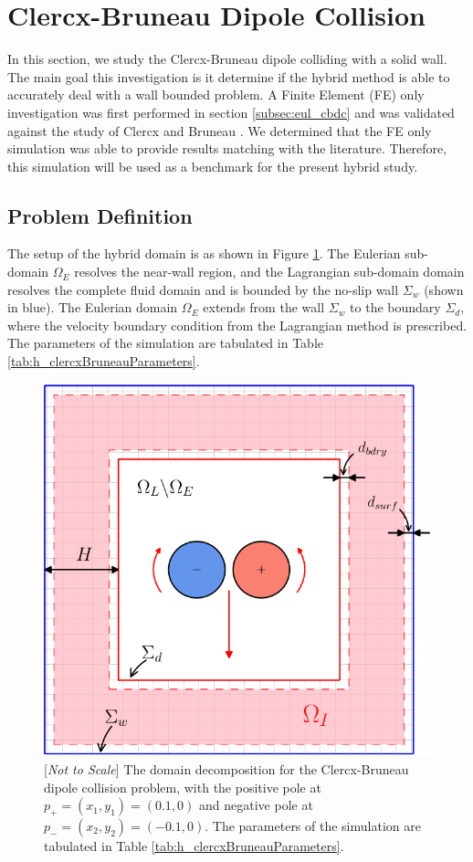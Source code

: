 \section{Clercx-Bruneau Dipole Collision}
\label{sec:vvhm-cbdcoll}

In this section, we study the Clercx-Bruneau dipole colliding with a solid wall. The main goal this investigation is it determine if the hybrid method is able to accurately deal with a wall bounded problem. A Finite Element (FE) only investigation was first performed in section \ref{subsec:eul_cbdc} and was validated against the study of Clercx and Bruneau \cite{Clercx2006a}. We determined that the FE only simulation was able to provide results matching with the literature. Therefore, this simulation will be used as a benchmark for the present hybrid study.

\subsection{Problem Definition}

The setup of the hybrid domain is as shown in Figure \ref{fig:hcbdc_dd}. The Eulerian sub-domain $\Omega_E$ resolves the near-wall region, and the Lagrangian sub-domain domain resolves the complete fluid domain and is bounded by the no-slip wall $\Sigma_{w}$ (shown in blue). The Eulerian domain $\Omega_E$ extends from the wall $\Sigma_{w}$ to the boundary $\Sigma_{d}$, where the velocity boundary condition from the Lagrangian method is prescribed. The parameters of the simulation are tabulated in Table \ref{tab:h_clercxBruneauParameters}.

	\begin{figure}[H]
	\centering
	\includegraphics[width=0.6\linewidth]{./figures/validation/cbColl/hcbdc_dd-crop.pdf}
	\caption{[\textit{Not to Scale}] The domain decomposition for the Clercx-Bruneau dipole collision problem, with the positive pole at $p_{+}=(x_1,y_1) = (0.1,0)$ and negative pole at $p_{-}=(x_2,y_2)=(-0.1,0)$. The parameters of the simulation are tabulated in Table \ref{tab:h_clercxBruneauParameters}.}
	\label{fig:hcbdc_dd}
	\end{figure}

